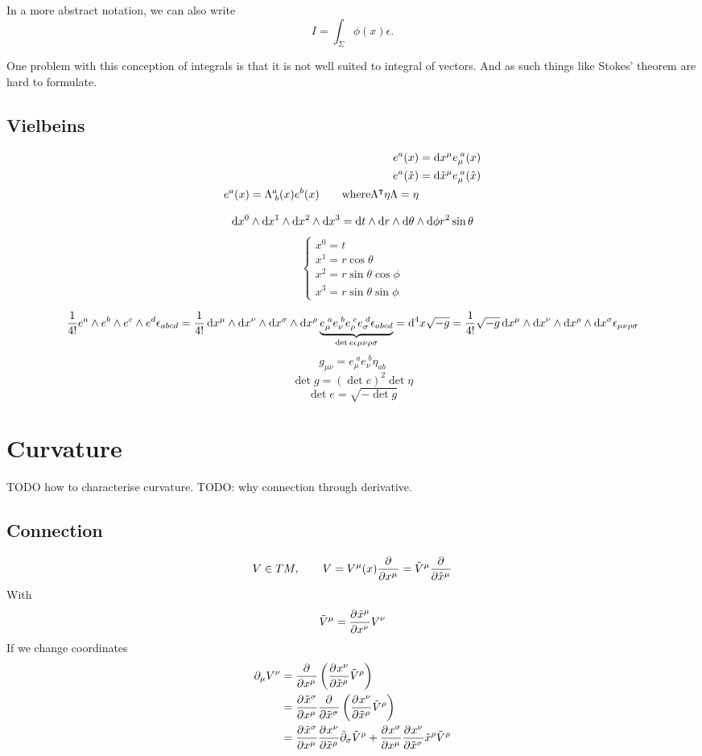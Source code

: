 In a more abstract notation, we can also write
\[ I = \int_\Sigma\phi(x)\epsilon. \]

One problem with this conception of integrals is that it is not well suited to integral of vectors. And as such things like Stokes' theorem are hard to formulate.

\subsection{Vielbeins}
\begin{align}
e^a(x) &= \operatorname{d \!}{x^\mu}e_\mu^{\;a}(x) \\
e^a(\tilde{x}) &= \operatorname{d \!}{\tilde{x}^\mu}e_\mu^{\;a}(\tilde{x}) \\
e^a(x) = \Lambda^a_{\;b}(x)e^b(x) \qquad \text{where} \Lambda^\intercal\eta\Lambda = \eta
\end{align}

\[ \diff{x^0}\wedge\diff{x^1}\wedge\diff{x^2}\wedge\diff{x^3} = \diff{t}\wedge\diff{r}\wedge\diff{\theta}\wedge\diff{\phi}r^2\sin\theta \]
\[ \begin{cases}
x^0 = t \\ x^1 = r\cos\theta \\ x^2 = r\sin\theta\cos\phi \\ x^3 = r\sin\theta\sin\phi
\end{cases} \]

\[ \frac{1}{4!}e^a\wedge e^b\wedge e^c\wedge e^d\epsilon_{abcd} = \frac{1}{4!}\diff{x^\mu}\wedge\diff{x^\nu}\wedge\diff{x^\sigma}\wedge\diff{x^\rho}\underbrace{e_\mu^{\;a}e_\nu^{\;b}e_\rho^{\;c}e_\sigma^{\;d}\epsilon_{abcd}}_{\det e \epsilon{\mu\nu\rho\sigma}} = \diff{^4x}\sqrt{-g} = \frac{1}{4!}\sqrt{-g} \diff{x^\mu}\wedge\diff{x^\nu}\wedge\diff{x^\rho}\wedge\diff{x^\sigma}\epsilon_{\mu\nu\rho\sigma} \]
\[g_{\mu\nu} = e_\mu^{\;a}e_\nu^{\;b}\eta_{ab}\]
\[ \det g = (\det e)^2 \det \eta \]
\[ \det e = \sqrt{-\det g} \]

\section{Curvature}
TODO how to characterise curvature. TODO: why connection through derivative.

\subsection{Connection}
\[ V\in TM, \qquad V = V^\mu(x) \frac{\partial{^{}}}{\partial{{x^\mu}^{}}}  = \tilde{V}^\mu  \frac{\partial{^{}}}{\partial{{\tilde{x}{^\mu}}^{}}} \]
With
\[ \tilde{V}^\mu =  \frac{\partial{^{}}\tilde{x}^\mu}{\partial{{x^\nu}^{}}} V^\nu \]
If we change coordinates
\begin{align}
\partial_\mu V^\nu &=  \frac{\partial{^{}}}{\partial{{x^\mu}^{}}} \left( \frac{\partial{^{}}x^\nu}{\partial{{\tilde{x}{^\rho}}^{}}} \tilde{V}^\rho\right) \\
&=  \frac{\partial{^{}}\tilde{x}^\sigma}{\partial{{x^\mu}^{}}}  \frac{\partial{^{}}}{\partial{{\tilde{x}{^\sigma}}^{}}} \left( \frac{\partial{^{}}x^\nu}{\partial{{\tilde{x}{^\rho}}^{}}} \tilde{V}^\rho\right) \\
&=  \frac{\partial{^{}}\tilde{x}^\sigma}{\partial{{x^\mu}^{}}}  \frac{\partial{^{}}x^\nu}{\partial{{\tilde{x}{^\rho}}^{}}} \tilde{\partial}_\sigma\tilde{V}^\rho +  \frac{\partial{^{}}x^\sigma}{\partial{{x^\mu}^{}}}  \frac{\partial{^{}}x^\nu}{\partial{{\tilde{x}{^\sigma}}^{}}} {\tilde{x}^\rho}\tilde{V}^\rho
\end{align}

